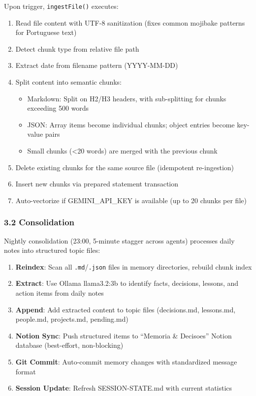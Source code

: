 \documentclass[
]{article}
\providecommand{\tightlist}{%
  \setlength{\itemsep}{0pt}\setlength{\parskip}{0pt}}
\begin{document}
Upon trigger, \texttt{ingestFile()} executes:

\begin{enumerate}
\def\labelenumi{\arabic{enumi}.}
\tightlist
\item
  Read file content with UTF-8 sanitization (fixes common mojibake
  patterns for Portuguese text)
\item
  Detect chunk type from relative file path
\item
  Extract date from filename pattern (YYYY-MM-DD)
\item
  Split content into semantic chunks:

  \begin{itemize}
  \tightlist
  \item
    Markdown: Split on H2/H3 headers, with sub-splitting for chunks
    exceeding 500 words
  \item
    JSON: Array items become individual chunks; object entries become
    key-value pairs
  \item
    Small chunks (\textless20 words) are merged with the previous chunk
  \end{itemize}
\item
  Delete existing chunks for the same source file (idempotent
  re-ingestion)
\item
  Insert new chunks via prepared statement transaction
\item
  Auto-vectorize if GEMINI\_API\_KEY is available (up to 20 chunks per
  file)
\end{enumerate}

\subsubsection{3.2 Consolidation}\label{consolidation}

Nightly consolidation (23:00, 5-minute stagger across agents) processes
daily notes into structured topic files:

\begin{enumerate}
\def\labelenumi{\arabic{enumi}.}
\tightlist
\item
  \textbf{Reindex}: Scan all \texttt{.md}/\texttt{.json} files in memory
  directories, rebuild chunk index
\item
  \textbf{Extract}: Use Ollama llama3.2:3b to identify facts, decisions,
  lessons, and action items from daily notes
\item
  \textbf{Append}: Add extracted content to topic files (decisions.md,
  lessons.md, people.md, projects.md, pending.md)
\item
  \textbf{Notion Sync}: Push structured items to ``Memoria \& Decisoes''
  Notion database (best-effort, non-blocking)
\item
  \textbf{Git Commit}: Auto-commit memory changes with standardized
  message format
\item
  \textbf{Session Update}: Refresh SESSION-STATE.md with current
  statistics
\end{enumerate}
\end{document}
